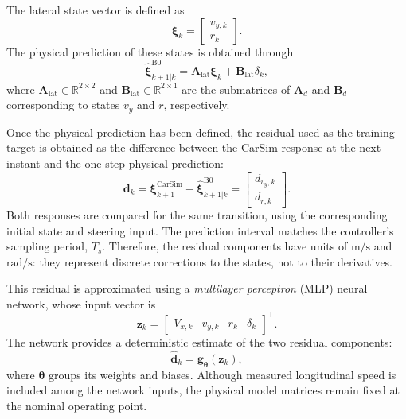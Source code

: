 \documentclass[12pt,a4paper]{report}
\begin{document}
The lateral state vector is defined as
%
\begin{equation}
    \boldsymbol{\xi}_k =
    \begin{bmatrix}
        v_{y,k} \\
        r_k
    \end{bmatrix}.
    \label{eq:b1_lateral_states}
\end{equation}
%
The physical prediction of these states is obtained through
%
\begin{equation}
    \hat{\boldsymbol{\xi}}^{\mathrm{B0}}_{k+1|k}
    =
    \mathbf{A}_{\mathrm{lat}}\boldsymbol{\xi}_k
    + \mathbf{B}_{\mathrm{lat}}\delta_k,
    \label{eq:b1_physical_prediction}
\end{equation}
%
where $\mathbf{A}_{\mathrm{lat}}\in\mathbb{R}^{2\times2}$ and $\mathbf{B}_{\mathrm{lat}}\in\mathbb{R}^{2\times1}$ are the submatrices of $\mathbf{A}_d$ and $\mathbf{B}_d$ corresponding to states $v_y$ and $r$, respectively.

Once the physical prediction has been defined, the residual used as the training target is obtained as the difference between the CarSim response at the next instant and the one-step physical prediction:
%
\begin{equation}
    \mathbf{d}_k
    =
    \boldsymbol{\xi}^{\mathrm{CarSim}}_{k+1}
    -
    \hat{\boldsymbol{\xi}}^{\mathrm{B0}}_{k+1|k}
    =
    \begin{bmatrix}
        d_{v_y,k} \\
        d_{r,k}
    \end{bmatrix}.
    \label{eq:b1_residual_target}
\end{equation}
%
Both responses are compared for the same transition, using the corresponding initial state and steering input. The prediction interval matches the controller's sampling period, $T_s$. Therefore, the residual components have units of $\mathrm{m/s}$ and $\mathrm{rad/s}$: they represent discrete corrections to the states, not to their derivatives.

This residual is approximated using a \textit{multilayer perceptron} (MLP) neural network, whose input vector is
%
\begin{equation}
    \mathbf{z}_k =
    \begin{bmatrix}
        V_{x,k} & v_{y,k} & r_k & \delta_k
    \end{bmatrix}^{\mathsf{T}}.
    \label{eq:b1_features}
\end{equation}
%
The network provides a deterministic estimate of the two residual components:
%
\begin{equation}
    \hat{\mathbf{d}}_k
    =
    \mathbf{g}_{\boldsymbol{\theta}}(\mathbf{z}_k),
    \label{eq:b1_residual_mapping}
\end{equation}
%
where $\boldsymbol{\theta}$ groups its weights and biases. Although measured longitudinal speed is included among the network inputs, the physical model matrices remain fixed at the nominal operating point.
\end{document}
